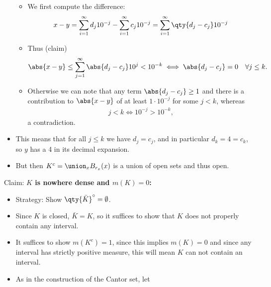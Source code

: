 \begin{solution}
\begin{itemize}
  \begin{itemize}
  \tightlist
  \item
    We first compute the difference:
    \begin{align*}  
    x - y &= \sum_{i=1}^\infty d_j 10^{-j} - \sum_{i=1}^\infty c_j 10^{-j} = \sum_{i=1}^\infty \qty{d_j - c_j} 10^{-j} \\
    \end{align*}
  \item
    Thus (claim)
    \begin{align*}
    \abs{x-y} &\leq \sum_{j=1}^\infty \abs{d_j - c_j} 10^j < 10^{-k} \iff \abs{d_j - c_j} = 0 \quad \forall j\leq k
    .\end{align*}
  \item
    Otherwise we can note that any term \(\abs{d_j - c_j}\geq 1\) and
    there is a contribution to \(\abs{x-y}\) of at least
    \(1\cdot 10^{-j}\) for some \(j < k\), whereas
    \begin{align*}  
    j < k \iff 10^{-j} > 10^{-k}
    ,\end{align*} a contradiction.
  \end{itemize}
\item
  This means that for all \(j \leq k\) we have \(d_j = c_j\), and in
  particular \(d_k = 4 = c_k\), so \(y\) has a 4 in its decimal
  expansion.
\item
  But then \(K^c = \union_x B_{r_x}(x)\) is a union of open sets and
  thus open.
\end{itemize}

Claim: \textbf{\(K\) is nowhere dense and \(m(K) = 0\):}

\begin{itemize}
\item
  Strategy: Show \(\qty{\bar K}^\circ = \emptyset\).
\item
  Since \(K\) is closed, \(\bar K = K\), so it suffices to show that
  \(K\) does not properly contain any interval.
\item
  It suffices to show \(m(K^c) = 1\), since this implies \(m(K) = 0\)
  and since any interval has strictly positive measure, this will mean
  \(K\) can not contain an interval.
\item
  As in the construction of the Cantor set, let


\end{itemize}
\end{solution}
